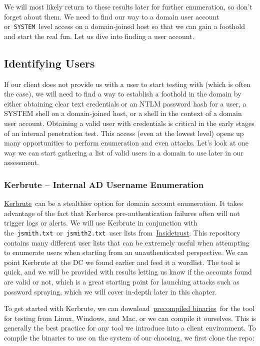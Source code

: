 We will most likely return to these results later for further enumeration, so don’t forget about them. We need to find our way to a domain user account or \verb|SYSTEM| level access on a domain-joined host so that we can gain a foothold and start the real fun. Let us dive into finding a user account.

\subsection{Identifying Users}

If our client does not provide us with a user to start testing with (which is often the case), we will need to find a way to establish a foothold in the domain by either obtaining clear text credentials or an NTLM password hash for a user, a SYSTEM shell on a domain-joined host, or a shell in the context of a domain user account. Obtaining a valid user with credentials is critical in the early stages of an internal penetration test. This access (even at the lowest level) opens up many opportunities to perform enumeration and even attacks. Let’s look at one way we can start gathering a list of valid users in a domain to use later in our assessment.

\subsubsection{Kerbrute – Internal AD Username Enumeration}

\href{https://github.com/ropnop/kerbrute}{Kerbrute} can be a stealthier option for domain account enumeration. It takes advantage of the fact that Kerberos pre-authentication failures often will not trigger logs or alerts. We will use Kerbrute in conjunction with the \verb|jsmith.txt| or \verb|jsmith2.txt| user lists from \href{https://github.com/insidetrust/statistically-likely-usernames}{Insidetrust}. This repository contains many different user lists that can be extremely useful when attempting to enumerate users when starting from an unauthenticated perspective. We can point Kerbrute at the DC we found earlier and feed it a wordlist. The tool is quick, and we will be provided with results letting us know if the accounts found are valid or not, which is a great starting point for launching attacks such as password spraying, which we will cover in-depth later in this chapter.

To get started with Kerbrute, we can download \href{https://github.com/ropnop/kerbrute/releases/latest}{precompiled binaries} for the tool for testing from Linux, Windows, and Mac, or we can compile it ourselves. This is generally the best practice for any tool we introduce into a client environment. To compile the binaries to use on the system of our choosing, we first clone the repo:

